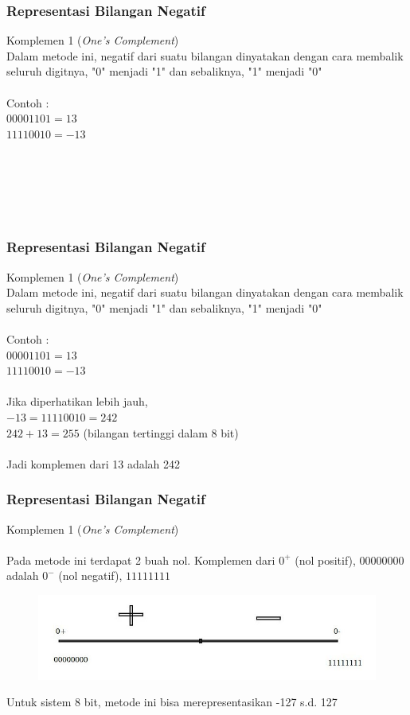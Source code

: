 \documentclass{beamer}
\begin{document}
\begin{frame}
\frametitle{Representasi Bilangan Negatif}
Komplemen 1 (\textit{One's Complement})
\\Dalam metode ini, negatif dari suatu bilangan dinyatakan dengan cara membalik seluruh digitnya, "0" menjadi "1" dan sebaliknya, "1" menjadi "0"
\\\ \\Contoh :
\\$00001101 = 13$
\\$11110010 = -13$
\\\ \\\ 
\\\ 
\\\ 
\\\ \\

\end{frame}


\begin{frame}
\frametitle{Representasi Bilangan Negatif}
Komplemen 1 (\textit{One's Complement})
\\Dalam metode ini, negatif dari suatu bilangan dinyatakan dengan cara membalik seluruh digitnya, "0" menjadi "1" dan sebaliknya, "1" menjadi "0"
\\\ \\Contoh :
\\$00001101 = 13$
\\$11110010 = -13$
\\\ \\Jika diperhatikan lebih jauh, 
\\$-13 = 11110010 = 242$
\\$242+13 = 255$ (bilangan tertinggi dalam 8 bit) 
\\\ \\Jadi komplemen dari 13 adalah 242

\end{frame}


\begin{frame}
\frametitle{Representasi Bilangan Negatif}
Komplemen 1 (\textit{One's Complement})
\\\ \\Pada metode ini terdapat 2 buah nol. Komplemen dari $0^+$ (nol positif), $00000000$ adalah $0^-$ (nol negatif), $11111111$
\begin{figure}[htp]
\centering
\includegraphics[scale=0.40]{Komp1.jpg}
\end{figure}
Untuk sistem 8 bit, metode ini bisa merepresentasikan -127 s.d. 127
\end{frame}
\end{document}
